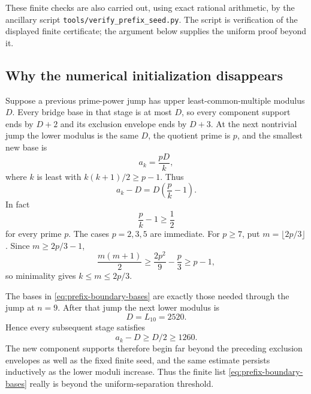 These finite checks are also carried out, using exact rational arithmetic, by the ancillary script \texttt{tools/verify\_prefix\_seed.py}.  The script is verification of the displayed finite certificate; the argument below supplies the uniform proof beyond it.

\subsection*{Why the numerical initialization disappears}

Suppose a previous prime-power jump has upper least-common-multiple modulus $D$.  Every bridge base in that stage is at most $D$, so every component support ends by $D+2$ and its exclusion envelope ends by $D+3$.  At the next nontrivial jump the lower modulus is the same $D$, the quotient prime is $p$, and the smallest new base is
\[
a_k=\frac{pD}{k},
\]
where $k$ is least with $k(k+1)/2\ge p-1$.  Thus
\begin{equation}\label{eq:successive-row-gap}
a_k-D=D\left(\frac pk-1\right).
\end{equation}
In fact
\[
\frac pk-1\ge\frac12
\]
for every prime $p$.  The cases $p=2,3,5$ are immediate.  For $p\ge7$, put $m=\lfloor2p/3\rfloor$.  Since $m\ge2p/3-1$,
\[
\frac{m(m+1)}2
\ge\frac{2p^2}{9}-\frac p3
\ge p-1,
\]
so minimality gives $k\le m\le2p/3$.

The bases in \eqref{eq:prefix-boundary-bases} are exactly those needed through the jump at $n=9$.  After that jump the next lower modulus is
\[
D=L_{10}=2520.
\]
Hence every subsequent stage satisfies
\[
a_k-D\ge D/2\ge1260.
\]
The new component supports therefore begin far beyond the preceding exclusion envelopes as well as the fixed finite seed, and the same estimate persists inductively as the lower moduli increase.  Thus the finite list \eqref{eq:prefix-boundary-bases} really is beyond the uniform-separation threshold.

